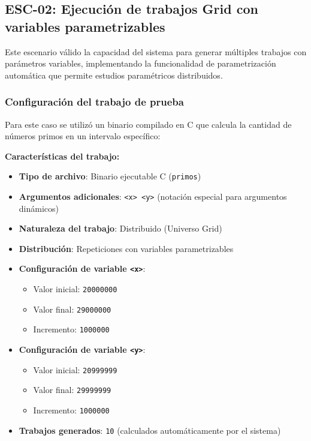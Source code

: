 \subsection{ESC-02: Ejecución de trabajos Grid con variables parametrizables}
\noindent

Este escenario válido la capacidad del sistema para generar múltiples trabajos con parámetros variables, implementando la funcionalidad de parametrización automática que permite estudios paramétricos distribuidos.

\subsubsection{Configuración del trabajo de prueba}
\noindent

Para este caso se utilizó un binario compilado en C que calcula la cantidad de números primos en un intervalo específico:

\textbf{Características del trabajo:}
\begin{itemize}
	\item \textbf{Tipo de archivo}: Binario ejecutable C (\texttt{primos})
	\item \textbf{Argumentos adicionales}: \texttt{<x> <y>} (notación especial para argumentos dinámicos)
	\item \textbf{Naturaleza del trabajo}: Distribuido (Universo Grid)
	\item \textbf{Distribución}: Repeticiones con variables parametrizables
	\item \textbf{Configuración de variable \texttt{<x>}}:
	\begin{itemize}
		\item Valor inicial: \texttt{20000000}
		\item Valor final: \texttt{29000000} 
		\item Incremento: \texttt{1000000}
	\end{itemize}
	\item \textbf{Configuración de variable \texttt{<y>}}:
	\begin{itemize}
		\item Valor inicial: \texttt{20999999}
		\item Valor final: \texttt{29999999}
		\item Incremento: \texttt{1000000}
	\end{itemize}
	\item \textbf{Trabajos generados}: \texttt{10} (calculados automáticamente por el sistema)
\end{itemize}

